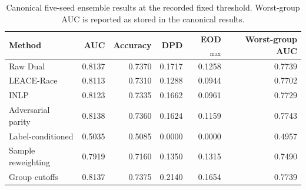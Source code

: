 \begin{table}[htbp]
\centering
\small
\caption{Canonical five-seed ensemble results at the recorded fixed threshold. Worst-group AUC is reported as stored in the canonical results.}
\label{tab:primary}
\begin{tabular}{lrrrrr}
\toprule
Method & AUC & Accuracy & DPD & EOD$_{\max}$ & Worst-group AUC \\
\midrule
Raw Dual & 0.8137 & 0.7370 & 0.1717 & 0.1258 & 0.7739 \\
LEACE-Race & 0.8113 & 0.7310 & 0.1288 & 0.0944 & 0.7702 \\
INLP & 0.8123 & 0.7335 & 0.1662 & 0.0961 & 0.7729 \\
Adversarial parity & 0.8138 & 0.7360 & 0.1624 & 0.1159 & 0.7743 \\
Label-conditioned & 0.5035 & 0.5085 & 0.0000 & 0.0000 & 0.4957 \\
Sample reweighting & 0.7919 & 0.7160 & 0.1350 & 0.1315 & 0.7490 \\
Group cutoffs & 0.8137 & 0.7375 & 0.2140 & 0.1654 & 0.7739 \\
\bottomrule
\end{tabular}
\end{table}
